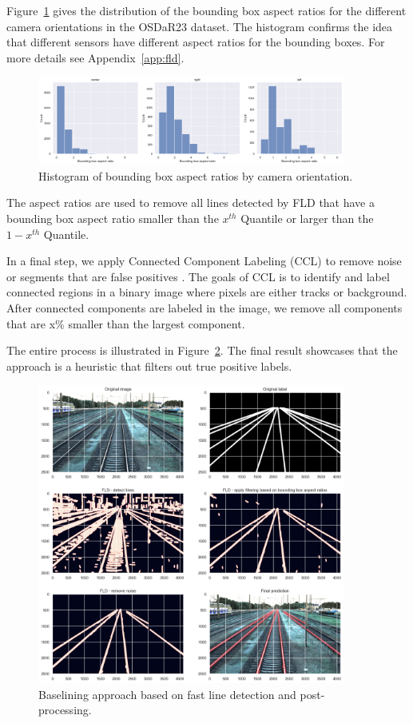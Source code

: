 \documentclass[Master,MDS,english]{BASE/twbook} %
\begin{document}
Figure~\ref{fig:bb_aspect_ratio_hist} gives the distribution of the bounding box aspect ratios for the different camera orientations in the OSDaR23 dataset. 
The histogram confirms the idea that different sensors have different aspect ratios for the bounding boxes. For more details see Appendix~\ref{app:fld}.


\begin{figure}[h]
\centering
\includegraphics[width=0.9\textwidth]{images/datasets/db/bb_ascpect_ratio_hist}
\caption{Histogram of bounding box aspect ratios by camera orientation. }
\label{fig:bb_aspect_ratio_hist}
\end{figure}

The aspect ratios are used to remove all lines detected by FLD that have a bounding box aspect ratio smaller than the $x^{th}$ Quantile or larger than the $1-x^{th}$ Quantile.

In a final step, we apply Connected Component Labeling (CCL) to remove noise or segments that are false positives \citep{CCL}. 
The goals of CCL is to identify and label connected regions in a binary image where pixels are either tracks or background. After connected components are labeled in the image, we remove all components that are x\% smaller than the largest component.

The entire process is illustrated in Figure~\ref{fig:fld_demo}. The final result showcases that the approach is a heuristic that filters out true positive labels.

\begin{figure}[h]
\centering
\includegraphics[width=0.9\textwidth]{images/fld/fld_demo}
\caption{Baselining approach based on fast line detection and post-processing. }
\label{fig:fld_demo}
\end{figure}
\end{document}
